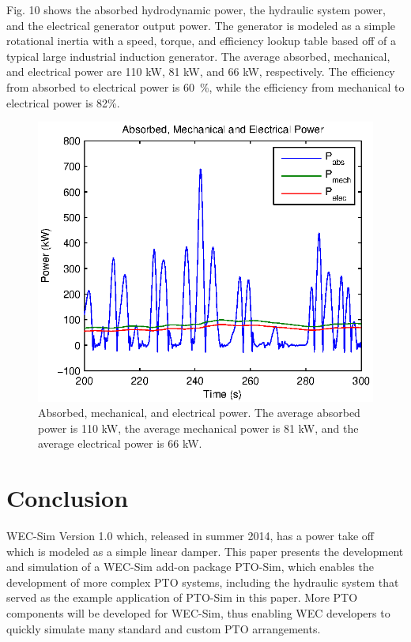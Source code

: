 \documentclass[conference]{IEEEtran}
\begin{document}
Fig. 10 shows the absorbed hydrodynamic power, the hydraulic system power, and the electrical generator output power.  The generator is modeled as a simple rotational inertia with a speed, torque, and efficiency lookup table based off of a typical large industrial induction generator. The average absorbed, mechanical, and electrical power are 110 kW, 81 kW, and 66 kW, respectively. The efficiency from absorbed to electrical power is 60~\%, while the efficiency from mechanical to electrical power is 82\%. 



\begin{figure}[t]
    \centering
    \includegraphics[width=1\columnwidth]{Images/Power}
    \caption{Absorbed, mechanical, and electrical power. The average absorbed power is 110 kW, the average mechanical power is 81 kW, and the average electrical power is 66 kW.}
    \end{figure}

\section{Conclusion}
WEC-Sim Version 1.0 which, released in summer 2014, has a power take off which is modeled as a simple linear damper. This paper presents the development and simulation of a WEC-Sim add-on package PTO-Sim, which enables the development of more complex PTO systems, including the hydraulic system that served as the example application of PTO-Sim in this paper. More PTO components will be developed for WEC-Sim, thus enabling WEC developers to quickly simulate many standard and custom PTO arrangements.
\end{document}
